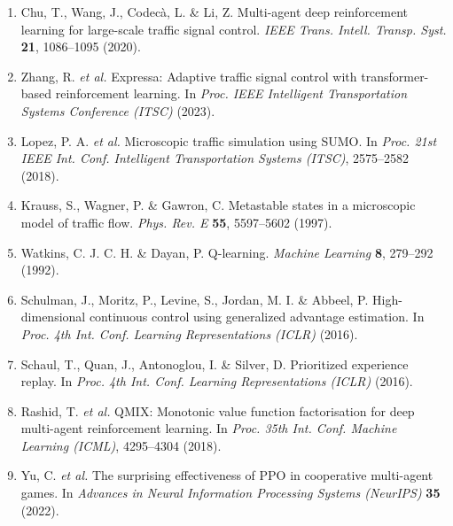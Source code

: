 \documentclass[10pt,a4paper]{article}
\begin{document}
\begin{enumerate}
    \item Chu, T., Wang, J., Codec\`{a}, L. \& Li, Z. Multi-agent deep reinforcement learning for large-scale traffic signal control. \textit{IEEE Trans. Intell. Transp. Syst.} \textbf{21}, 1086--1095 (2020).
    \item Zhang, R. \textit{et al.} Expressa: Adaptive traffic signal control with transformer-based reinforcement learning. In \textit{Proc. IEEE Intelligent Transportation Systems Conference (ITSC)} (2023).
    \item Lopez, P. A. \textit{et al.} Microscopic traffic simulation using SUMO. In \textit{Proc. 21st IEEE Int. Conf. Intelligent Transportation Systems (ITSC)}, 2575--2582 (2018).
    \item Krauss, S., Wagner, P. \& Gawron, C. Metastable states in a microscopic model of traffic flow. \textit{Phys. Rev. E} \textbf{55}, 5597--5602 (1997).
    \item Watkins, C. J. C. H. \& Dayan, P. Q-learning. \textit{Machine Learning} \textbf{8}, 279--292 (1992).
    \item Schulman, J., Moritz, P., Levine, S., Jordan, M. I. \& Abbeel, P. High-dimensional continuous control using generalized advantage estimation. In \textit{Proc. 4th Int. Conf. Learning Representations (ICLR)} (2016).
    \item Schaul, T., Quan, J., Antonoglou, I. \& Silver, D. Prioritized experience replay. In \textit{Proc. 4th Int. Conf. Learning Representations (ICLR)} (2016).
    \item Rashid, T. \textit{et al.} QMIX: Monotonic value function factorisation for deep multi-agent reinforcement learning. In \textit{Proc. 35th Int. Conf. Machine Learning (ICML)}, 4295--4304 (2018).
    \item Yu, C. \textit{et al.} The surprising effectiveness of PPO in cooperative multi-agent games. In \textit{Advances in Neural Information Processing Systems (NeurIPS)} \textbf{35} (2022).
\end{enumerate}
\end{document}

